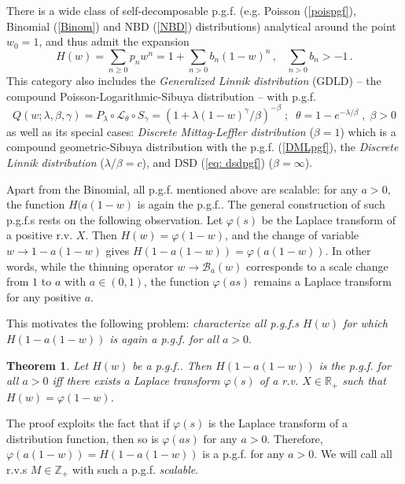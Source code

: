 \documentclass[a4paper,12pt]{amsart}
\newcommand{\Z}{\mathbb{Z}_{+}}
\newcommand{\R}{\mathbb{R}_{+}}
\newtheorem{Theorem}{Theorem}[section]
\theoremstyle{definition}
\theoremstyle{remark}
\begin{document}
There is a wide class of self-decomposable p.g.f. (e.g. Poisson (\ref{poispgf}), Binomial (\ref{Binom}) and NBD (\ref{NBD}) distributions) analytical around the point $w_0=1$, and  thus admit the expansion 
\begin{equation}
 H(w)=\sum_{n\geq 0} p_n w^n= 1+\sum_{n>0} b_n (1-w)^n \, , \;\;\;  \sum_{n>0} b_n > -1\, .
\end{equation}
 This category also includes the {\it Generalized Linnik distribution} (GDLD) \cite{Christoph1998} -- the compound Poisson-Logarithmic-Sibuya distribution  \cite{Christoph1998} -- with p.g.f.
 \begin{equation}\label{GDLDpgf1}
Q(w;\lambda,\beta,\gamma)=
P_{\lambda}\circ\mathcal{L}_{\theta}\circ S_{\gamma}
=(1+\lambda(1-w)^{\gamma}/\beta)^{-\beta}\;;\;\;\theta=1-e^{-\lambda/\beta}\;, \;\beta>0  \end{equation}
as well as its special cases: {\it Discrete Mittag-Leffler distribution} \cite{Pillai1995, Huillet2019} ($\beta=1$) which is a compound geometric-Sibuya distribution with the p.g.f. (\ref{DMLpgf}), the {\it Discrete Linnik distribution} \cite{Huillet2019, Dev1993} ($\lambda/\beta=c$), and DSD (\ref{eq: dsdpgf}) ($\beta=\infty$). 

Apart from the Binomial, all p.g.f. mentioned above are scalable: for any $a>0$, the function $H(a(1-w)$ is again the p.g.f.. The general construction of such p.g.f.{}s rests on the following observation. Let $\varphi (s)$ be the Laplace transform of a positive r.v. $X$. Then $H(w)=\varphi (1-w)$, and the change of variable $w \to 1 - a(1-w)$ gives $H(1-a(1-w))=\varphi (a(1-w))$. In other words, while the thinning operator $w \rightarrow \mathcal{B}_a(w)$ corresponds to a scale change from $1$ to $a$ with $a \in (0,1)$, the function $\varphi(as)$ remains a Laplace transform for any positive $a$. 

 This motivates the following problem: {\it characterize all p.g.f.{}s $H(w)$ for which $H(1-a(1-w))$ is again a p.g.f. for all $a>0$}. 


\begin{Theorem} {\rm \cite{ Klebanov2023-xj, KlSum2026} }\label{thK}
Let $H(w)$ be a p.g.f.. Then $H(1-a(1-w))$ is the p.g.f. for all $a>0$ iff there exists a Laplace transform $\varphi (s)$ of a r.v. $X\in \R$  such that $H(w)=\varphi (1-w)$. 
\end{Theorem} 
The proof exploits the fact that if $\varphi(s)$ is the Laplace transform of a distribution function, then so is $\varphi(as)$ for any $a>0$. Therefore, $\varphi(a(1-w))=H(1-a(1-w))$ is a p.g.f. for any $a>0$. We will call all r.v.s $M \in \Z$ with such a p.g.f. {\it scalable}.
\end{document}
